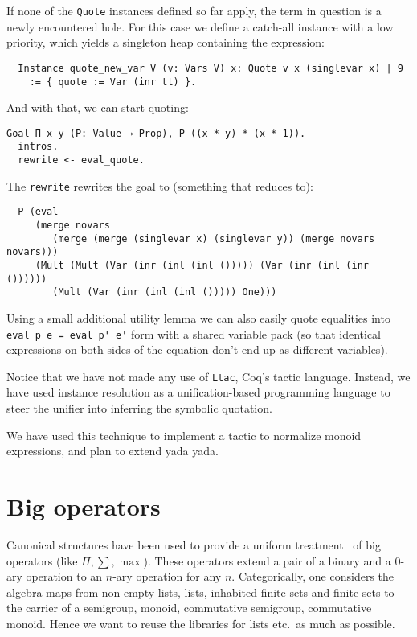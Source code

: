 \documentclass[a4paper,10pt,runningheads]{llncs}
\begin{document}
If none of the \lstinline|Quote| instances defined so far apply, the term in question is a newly encountered hole. For this case we define a catch-all instance with a low priority, which yields a singleton heap containing the expression:
\begin{lstlisting}
  Instance quote_new_var V (v: Vars V) x: Quote v x (singlevar x) | 9
    := { quote := Var (inr tt) }.
\end{lstlisting}
And with that, we can start quoting:
\begin{lstlisting}
Goal Π x y (P: Value → Prop), P ((x * y) * (x * 1)).
  intros.
  rewrite <- eval_quote.
\end{lstlisting}
The \lstinline|rewrite| rewrites the goal to (something that reduces to):
\begin{lstlisting}
  P (eval
     (merge novars
        (merge (merge (singlevar x) (singlevar y)) (merge novars novars)))
     (Mult (Mult (Var (inr (inl (inl ())))) (Var (inr (inl (inr ())))))
        (Mult (Var (inr (inl (inl ())))) One)))
\end{lstlisting}

Using a small additional utility lemma we can also easily quote equalities into \lstinline|eval p e = eval p' e'| form with a shared variable pack (so that identical expressions on both sides of the equation don't end up as different variables).

Notice that we have not made any use of \lstinline|Ltac|, Coq's tactic language. Instead, we have used instance resolution as a unification-based programming language to steer the unifier into inferring the symbolic quotation.


We have used this technique to implement a tactic to normalize monoid expressions, and plan to extend yada yada.


\section{Big operators}
Canonical structures have been used to provide a uniform treatment~\cite{bertot2008canonical} of big
operators (like $\Pi,\sum, \max$). These operators extend a pair of a binary and a 0-ary operation
to an $n$-ary operation for any $n$. Categorically, one considers the algebra maps from non-empty
lists, lists, inhabited finite sets and finite sets to the carrier of a semigroup, monoid,
commutative semigroup, commutative monoid. Hence we want to reuse the libraries for lists etc.\ as much as possible.
\end{document}
